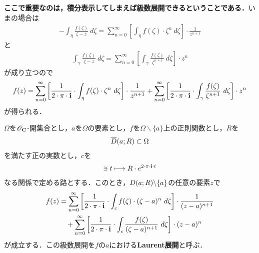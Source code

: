 	{\bf ここで重要なのは，積分表示してしまえば級数展開できるということである．}いまの場合は
	\begin{align}
		-\int_{\eta} \frac{f(\zeta)}{\zeta - z}\ d\zeta
		= \sum_{n=0}^{\infty} \left[ \int_{\eta} f(\zeta) \cdot \zeta^{n}\ d\zeta \right] \cdot \frac{1}{z^{n+1}}
	\end{align}
	と
	\begin{align}
		\int_{\gamma} \frac{f(\zeta)}{\zeta - z}\ d\zeta
		= \sum_{n=0}^{\infty} \left[ \int_{\gamma} \frac{f(\zeta)}{\zeta^{n+1}}\ d\zeta \right] \cdot z^{n}
	\end{align}
	が成り立つので
	\begin{align}
		f(z) = \sum_{n=0}^{\infty} \left[ \frac{1}{2\cdot\pi\cdot\mathbf{i}} \cdot \int_{\eta} f(\zeta) \cdot \zeta^{n}\ d\zeta \right] \cdot \frac{1}{z^{n+1}}
		+ \sum_{n=0}^{\infty} \left[ \frac{1}{2\cdot\pi\cdot\mathbf{i}} \cdot \int_{\gamma} \frac{f(\zeta)}{\zeta^{n+1}}\ d\zeta \right] \cdot z^{n}
	\end{align}
	が得られる．
	
	\begin{screen}
		\begin{thm}[Laurent展開]
			$\Omega$を$\mathscr{O}_{\mathbf{C}}$-開集合とし，$a$を$\Omega$の要素とし，$f$を$\Omega \backslash \{a\}$上の正則関数とし，$R$を
			\begin{align}
				\overline{D}(a;R) \subset \Omega
			\end{align}
			を満たす正の実数とし，$c$を
			\begin{align}
				[0,1] \ni t \longmapsto R \cdot e^{2 \cdot \pi \cdot \isym \cdot t}
			\end{align}
			なる関係で定める路とする．このとき，$D(a;R) \backslash \{a\}$の任意の要素$z$で
			\begin{align}
				f(z) &= \sum_{n=0}^{\infty} \left[ \frac{1}{2\cdot\pi\cdot\mathbf{i}} \cdot \int_{c} f(\zeta) \cdot (\zeta-a)^{n}\ d\zeta \right] \cdot \frac{1}{(z-a)^{n+1}} \\
				&\quad + \sum_{n=0}^{\infty} \left[ \frac{1}{2\cdot\pi\cdot\mathbf{i}} \cdot \int_{c} \frac{f(\zeta)}{(\zeta-a)^{n+1}}\ d\zeta \right] \cdot (z-a)^{n}
			\end{align}
			が成立する．この級数展開を$f$の$a$における{\bf Laurent展開}と呼ぶ．
		\end{thm}
	\end{screen}
	
	\begin{sketch}
		
	\end{sketch}